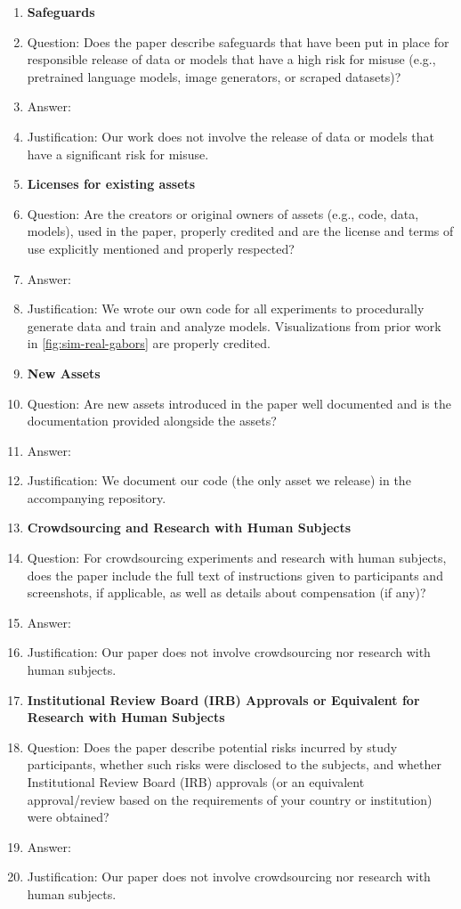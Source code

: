 \begin{enumerate}
\item {\bf Safeguards}
    \item[] Question: Does the paper describe safeguards that have been put in place for responsible release of data or models that have a high risk for misuse (e.g., pretrained language models, image generators, or scraped datasets)?
    \item[] Answer: \answerNA
    \item[] Justification: Our work does not involve the release of data or models that have a significant risk for misuse.
\item {\bf Licenses for existing assets}
    \item[] Question: Are the creators or original owners of assets (e.g., code, data, models), used in the paper, properly credited and are the license and terms of use explicitly mentioned and properly respected?
    \item[] Answer: \answerYes
    \item[] Justification: We wrote our own code for all experiments to procedurally generate data and train and analyze models.
      Visualizations from prior work in \cref{fig:sim-real-gabors} are properly credited.
\item {\bf New Assets}
    \item[] Question: Are new assets introduced in the paper well documented and is the documentation provided alongside the assets?
    \item[] Answer: \answerYes
    \item[] Justification: We document our code (the only asset we release) in the accompanying repository.
\item {\bf Crowdsourcing and Research with Human Subjects}
    \item[] Question: For crowdsourcing experiments and research with human subjects, does the paper include the full text of instructions given to participants and screenshots, if applicable, as well as details about compensation (if any)? 
    \item[] Answer: \answerNA
    \item[] Justification: Our paper does not involve crowdsourcing nor research with human subjects.
\item {\bf Institutional Review Board (IRB) Approvals or Equivalent for Research with Human Subjects}
    \item[] Question: Does the paper describe potential risks incurred by study participants, whether such risks were disclosed to the subjects, and whether Institutional Review Board (IRB) approvals (or an equivalent approval/review based on the requirements of your country or institution) were obtained?
    \item[] Answer: \answerNA
    \item[] Justification: Our paper does not involve crowdsourcing nor research with human subjects.
\end{enumerate}
